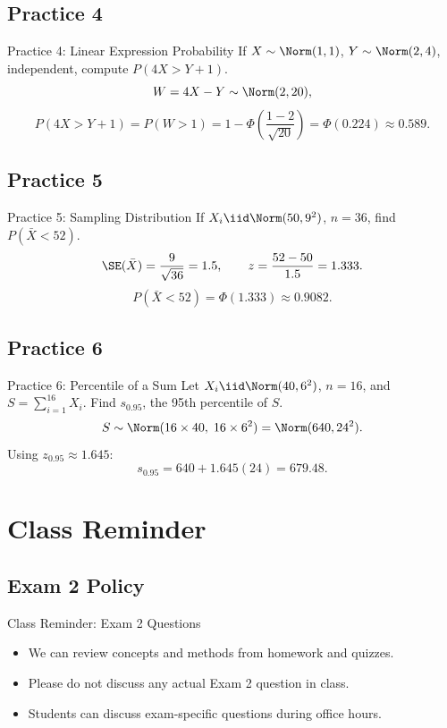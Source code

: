 \documentclass[aspectratio=169]{beamer}
\begin{document}
\subsection{Practice 4}
\begin{frame}{Practice 4: Linear Expression Probability}
  If \(X\sim\Norm(1,1)\), \(Y\sim\Norm(2,4)\), independent,
  compute \(P(4X>Y+1)\).
  \pause
  \[
    W=4X-Y\sim\Norm(2,20),
  \]
  \[
    P(4X>Y+1)=P(W>1)
    =1-\Phi\!\left(\frac{1-2}{\sqrt{20}}\right)
    =\Phi(0.224)\approx0.589.
  \]
\end{frame}

\subsection{Practice 5}
\begin{frame}{Practice 5: Sampling Distribution}
  If \(X_i\iid\Norm(50,9^2)\), \(n=36\), find \(P(\bar X<52)\).
  \pause
  \[
    \SE(\bar X)=\frac{9}{\sqrt{36}}=1.5,
    \qquad
    z=\frac{52-50}{1.5}=1.333.
  \]
  \[
    P(\bar X<52)=\Phi(1.333)\approx0.9082.
  \]
\end{frame}

\subsection{Practice 6}
\begin{frame}{Practice 6: Percentile of a Sum}
  Let \(X_i\iid\Norm(40,6^2)\), \(n=16\), and \(S=\sum_{i=1}^{16}X_i\).
  Find \(s_{0.95}\), the 95th percentile of \(S\).
  \pause
  \[
    S\sim\Norm(16\times40,\;16\times6^2)=\Norm(640,24^2).
  \]
  Using \(z_{0.95}\approx1.645\):
  \[
    s_{0.95}=640+1.645(24)=679.48.
  \]
\end{frame}

\section{Class Reminder}

\subsection{Exam 2 Policy}
\begin{frame}{Class Reminder: Exam 2 Questions}
  \begin{itemize}
    \item We can review concepts and methods from homework and quizzes.
    \item Please do not discuss any actual Exam 2 question in class.
    \item Students can discuss exam-specific questions during office hours.
  \end{itemize}
\end{frame}
\end{document}
